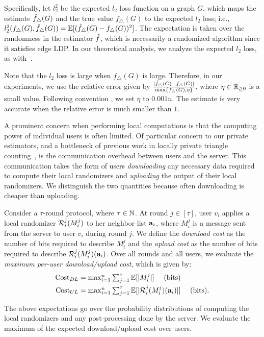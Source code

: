 Specifically,
let $l_2^2$ be the expected $l_2$ loss function on a graph $G$, which maps the 
estimate $\hat{f}_\triangle(G)$ and the true value $f_\triangle(G)$ to the expected $l_2$ loss; i.e., 
$l_2^2(f_\triangle(G), \hat{f}_\triangle(G)) = \operatorname{\mathbb{E}}[(\hat{f}_\triangle(G) - f_\triangle(G))^2]$.
The 
expectation is taken over the randomness in the estimator $\hat{f}$, which is
necessarily a randomized algorithm since it satisfies edge LDP.
In our theoretical analysis, we analyze the expected $l_2$ loss, as with~\cite{Kairouz_ICML16,Wang_USENIX17,Murakami_USENIX19}.

Note that the $l_2$ loss is large when $f_\triangle(G)$ is large. 
Therefore, in our experiments, we use the relative error given by $\frac{|\hat{f}_\triangle(G) - f_\triangle(G)|}{\max\{f_\triangle(G), \eta\}}$, 
where $\eta \in \mathbb{R}_{\ge0}$ is a small value. 
Following convention 
\cite{Bindschaedler_SP16,Chen_CCS12,Xiao_SIGMOD11}, 
we set $\eta$ to $0.001n$. 
The estimate is very accurate when the relative error is much smaller than $1$.

\smallskip
{}
A prominent concern when performing local computations is that the computing power of
individual users is often limited. Of particular concern to our private
estimators, and a bottleneck of previous work in locally private triangle
counting~\cite{Imola_USENIX21}, is the communication overhead between users and
the server. This communication takes the form of users 
\emph{downloading} any necessary data required to compute their local randomizers and 
\emph{uploading} the output of their local randomizers. We distinguish the two
quantities because often downloading is cheaper than uploading.

Consider a $\tau$-round protocol, where $\tau \in \mathbb{N}$. 
At round $j \in [\tau]$, user $v_i$ applies a local randomizer $\mathcal{R}_i^j(M_i^j)$ to her neighbor list $\mathbf{a}_i$, where
$M_i^j$ is a message sent from the server to user $v_i$ during round $j$.
We define the \emph{download cost} 
as 
the number of bits required to describe
$M_i^j$ and the \emph{upload cost} 
as 
the number of bits required to
describe $\mathcal{R}_i^j(M_i^j)(\mathbf{a}_i)$. 
Over all rounds and all users, we evaluate the \textit{maximum per-user download/upload cost}, which is given by:
\begin{align}
  \mathrm{Cost}_{DL} &= \textstyle{\max_{i=1}^n \sum_{j=1}^\tau \operatorname{\mathbb{E}}[|M_i^j|] ~~~~ \text{(bits)}} \label{chap2-eq:cost_DL}\\
  \mathrm{Cost}_{UL} &= \textstyle{\max_{i=1}^n \sum_{j=1}^\tau \operatorname{\mathbb{E}}[|\mathcal{R}_i^j(M_i^j)(\mathbf{a}_i)|]} ~~~~ \text{(bits)}. \label{chap2-eq:cost_UL}
\end{align}

The above expectations go over the probability distributions of computing the local
randomizers 
and any post-processing done by the server. 
We evaluate the maximum of the expected download/upload cost over users.